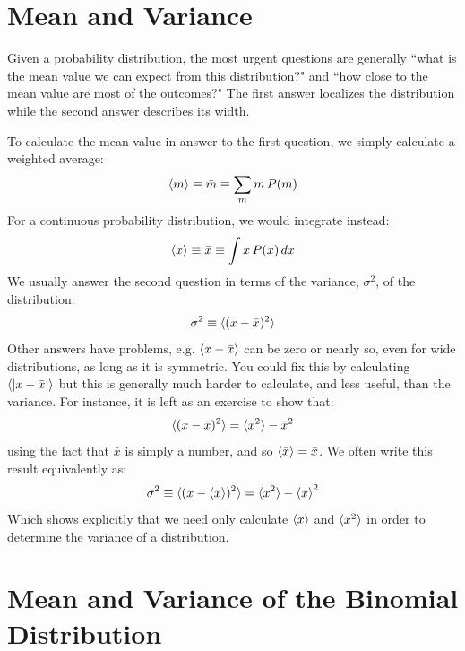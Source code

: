 \documentclass[12pt]{article}
\begin{document}
\section{Mean and Variance}

Given a probability distribution, the most urgent questions are generally ``what is the mean value we can expect from this distribution?" and ``how close to the mean value are most of the outcomes?"  The first answer localizes the distribution while the second answer describes its width.

To calculate the mean value in answer to the first question, we simply calculate a weighted average:
\begin{equation}
\braket{m} \equiv \bar{m} \equiv \sum_m m \, P(m) 
\end{equation}
For a continuous probability distribution, we would integrate instead:
\begin{equation}
\braket{x} \equiv \bar{x} \equiv \int x \, P(x) \, dx 
\end{equation}
We usually answer the second question in terms of the variance, $\sigma^2$, of the distribution:
\begin{displaymath}
\sigma^2 \equiv \braket{(x-\bar{x})^2}
\end{displaymath}
Other answers have problems, e.g. $\braket{x-\bar{x}}$ can be zero or nearly so, even for wide distributions, as long as it is symmetric.  You could fix this by calculating $\braket{|x-\bar{x}|}$ but this is generally much harder to calculate, and less useful, than the variance.  For instance, it is left as an exercise to show that:
\begin{equation}
\label{eqn:varhw}
\braket{(x-\bar{x})^2} = \braket{x^2} -\bar{x}^2
\end{equation}
using the fact that $\bar{x}$ is simply a number, and so $\braket{\bar{x}} = \bar{x}$.  We often write this result equivalently as:
\begin{equation}
\label{eqn:variance}
\sigma^2 \equiv \braket{(x-\braket{x})^2} = \braket{x^2} - \braket{x}^2
\end{equation}
Which shows explicitly that we need only calculate $\braket{x}$ and $\braket{x^2}$ in order to determine the variance of a distribution.

\section{Mean and Variance of the Binomial Distribution}
\end{document}
